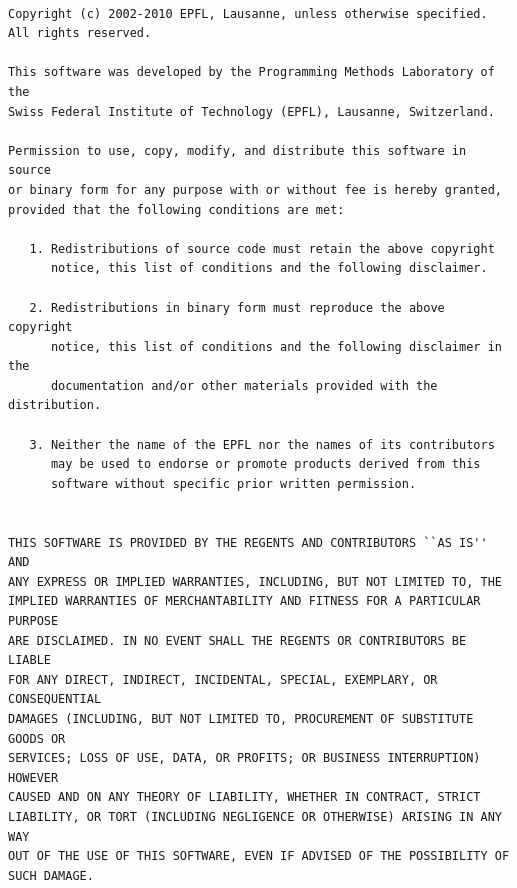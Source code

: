 \documentclass[10pt,a4paper,oneside]{scrreprt}
\begin{document}
\begin{verbatim}

Copyright (c) 2002-2010 EPFL, Lausanne, unless otherwise specified.
All rights reserved.

This software was developed by the Programming Methods Laboratory of the
Swiss Federal Institute of Technology (EPFL), Lausanne, Switzerland.

Permission to use, copy, modify, and distribute this software in source
or binary form for any purpose with or without fee is hereby granted,
provided that the following conditions are met:

   1. Redistributions of source code must retain the above copyright
      notice, this list of conditions and the following disclaimer.

   2. Redistributions in binary form must reproduce the above copyright
      notice, this list of conditions and the following disclaimer in the
      documentation and/or other materials provided with the distribution.

   3. Neither the name of the EPFL nor the names of its contributors
      may be used to endorse or promote products derived from this
      software without specific prior written permission.


THIS SOFTWARE IS PROVIDED BY THE REGENTS AND CONTRIBUTORS ``AS IS'' AND
ANY EXPRESS OR IMPLIED WARRANTIES, INCLUDING, BUT NOT LIMITED TO, THE
IMPLIED WARRANTIES OF MERCHANTABILITY AND FITNESS FOR A PARTICULAR PURPOSE
ARE DISCLAIMED. IN NO EVENT SHALL THE REGENTS OR CONTRIBUTORS BE LIABLE
FOR ANY DIRECT, INDIRECT, INCIDENTAL, SPECIAL, EXEMPLARY, OR CONSEQUENTIAL
DAMAGES (INCLUDING, BUT NOT LIMITED TO, PROCUREMENT OF SUBSTITUTE GOODS OR
SERVICES; LOSS OF USE, DATA, OR PROFITS; OR BUSINESS INTERRUPTION) HOWEVER
CAUSED AND ON ANY THEORY OF LIABILITY, WHETHER IN CONTRACT, STRICT
LIABILITY, OR TORT (INCLUDING NEGLIGENCE OR OTHERWISE) ARISING IN ANY WAY
OUT OF THE USE OF THIS SOFTWARE, EVEN IF ADVISED OF THE POSSIBILITY OF
SUCH DAMAGE.
\end{verbatim} 

\clearpage
\bib
\end{document}
